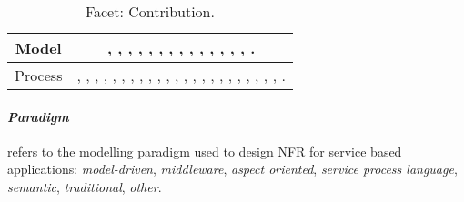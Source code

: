 \begin{table}
\begin{tabular}{|c|c|}
\\ \hline
Model	&	
\parbox{0.6\textwidth}{\cite{p005}, \cite{p013}, \cite{p018}, \cite{p022}, \cite{p024}, \cite{p034}, \cite{p055}, \cite{p056}, \cite{p070}, \cite{p072}, \cite{p110}, \cite{p114}, \cite{p150}, \cite{p163}, \cite{p168}.}
\\ \hline
Process	&	
\parbox{0.6\textwidth}{\cite{p009}, \cite{p011}, \cite{p014}, \cite{p023}, \cite{p028}, \cite{p029}, \cite{p031}, \cite{p040}, \cite{p047}, \cite{p049}, \cite{p053}, \cite{p061}, \cite{p074}, \cite{p096}, \cite{p124}, \cite{p128}, \cite{p136}, \cite{p139}, \cite{p141}, \cite{p142}, \cite{p152}, \cite{p161}, \cite{p162}, \cite{p170}.}
\\ \hline
\end{tabular}
\caption{\label{table:biblioContrib} Facet: Contribution.}
\end{table}

\paragraph {\bf\em Paradigm} 
refers to the modelling paradigm used to design NFR for service based applications: {\em model-driven},	{\em middleware}, {\em aspect oriented},	{\em service process language},		{\em semantic}, 	{\em traditional}, {\em other}.

